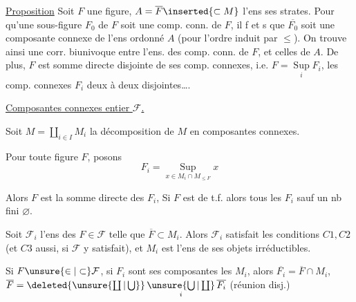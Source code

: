 \uline{Proposition} Soit $F$ une figure, $A=\overline F\inserted{\subset M}$ l'ens  ses strates.  Pour qu'une sous-figure  $F_0$ de $F$ soit une comp. conn. de $F$, il f et s que $\overline{F_0}$ soit une composante connexe de l'ens ordonné $A$ (pour l'ordre induit par $\leq$). On trouve ainsi une corr. biunivoque entre l'ens. des comp. conn.
de $F$, et celles de $A$. De plus, $F$ est somme directe disjointe de ses comp. connexes, i.e. $F=\mathop{\mathrm{Sup}}\limits_i F_i$, les comp. connexes $F_i$ deux à deux disjointes\ldots .


\uline{Composantes connexes   entier $\mathcal F$.}

Soit $M=\coprod_{i\in I}M_i$ la décomposition de $M$ en composantes connexes.

Pour toute figure $F$, posons
\[
F_i=\mathop{\mathrm{Sup}}\limits_{x\in M_i\cap M_{\leq F}}x
\]

Alors $F$ est la somme directe des $F_i$,  Si $F$ est de t.f.  alors tous les $F_i$ sauf un nb fini  $\varnothing$.

 Soit $\mathcal F_i$ l'ens des $F\in\mathcal F$ telle que $\overline F\subset M_i$. Alors  $\mathcal F_i$ satisfait les conditions $C1,C2$ (et $C3$ aussi, si $\mathcal F$ y satisfait), et $M_i$ est l'ens de ses objets irréductibles.

Si $F\unsure{\in|\subset}\mathcal F$, si $F_i$ sont ses composantes  les $M_i$, alors $\overline{F_i}=\overline F\cap M_i$, $\overline F=\deleted{\unsure{\coprod|\bigcup}}\mathop{\unsure{\bigcup|\coprod}}\limits_i\overline{F_i}$ (réunion disj.)

